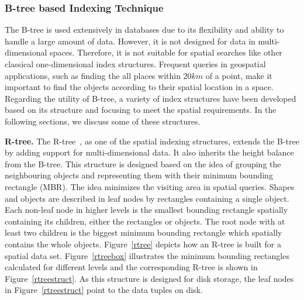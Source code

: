 \documentclass[a4paper,12pt]{article}
\begin{document}
\subsubsection{B-tree based Indexing Technique}
\label{b-tree-based}
The B-tree is used extensively in databases due to its flexibility and ability to handle a large amount of data. However, it is not designed for data in multi-dimensional spaces. Therefore, it is not suitable for spatial searches like other classical one-dimensional index structures. Frequent queries in geospatial applications, such as finding the all places within $20 km$ of a point, make it important to find the objects according to their spatial location in a space. Regarding the utility of B-tree, a variety of index structures have been developed based on its structure and focusing to meet the spatial requirements. In the following sections, we discuss some of these structures.

\textbf{R-tree.} The R-tree~\cite{rtree}, as one of the spatial indexing structures, extends the B-tree by adding support for multi-dimensional data. It also inherits the height balance from the B-tree. This structure is designed based on the idea of grouping the neighbouring objects and representing them with their minimum bounding rectangle (MBR). The idea minimizes the visiting area in spatial queries. Shapes and objects are described in leaf nodes by rectangles containing a single object. Each non-leaf node in higher levels is the smallest bounding rectangle spatially containing its children, either the rectangles or objects. The root node with at least two children is the biggest minimum bounding rectangle which spatially contains the whole objects. Figure~\ref{rtree} depicts how an R-tree is built for a spatial data set. Figure~\ref{rtreebox} illustrates the minimum bounding rectangles calculated for different levels
and the corresponding R-tree is shown in Figure~\ref{rtreestruct}.
As this structure is designed for disk storage, the leaf nodes in Figure~\ref{rtreestruct} point to the data tuples on disk.
\end{document}
